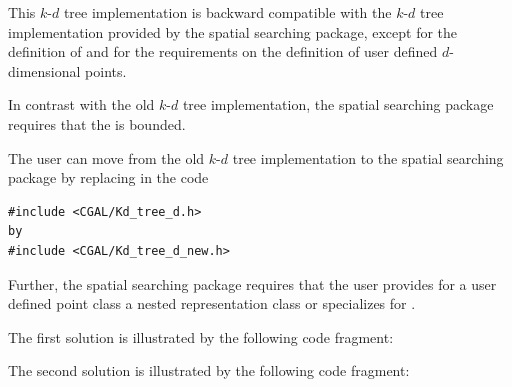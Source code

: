 This $k$-$d$ tree implementation is backward compatible with the
$k$-$d$ tree implementation provided by the spatial searching package,
except for the definition of  and for the
requirements on the definition of user defined $d$-dimensional points.

In contrast with the old $k$-$d$ tree implementation, the spatial searching package
requires that the  is bounded.

The user can move from the old $k$-$d$ tree implementation to the spatial searching package by
replacing in the code \\
\begin{verbatim}
#include <CGAL/Kd_tree_d.h>
by
#include <CGAL/Kd_tree_d_new.h>
\end{verbatim}
 
Further, the spatial searching package requires that the user provides
for a user defined point class  a nested representation
class  or specializes  for
.

The first solution is illustrated by the following code fragment:


The second solution is illustrated by the following code fragment:


